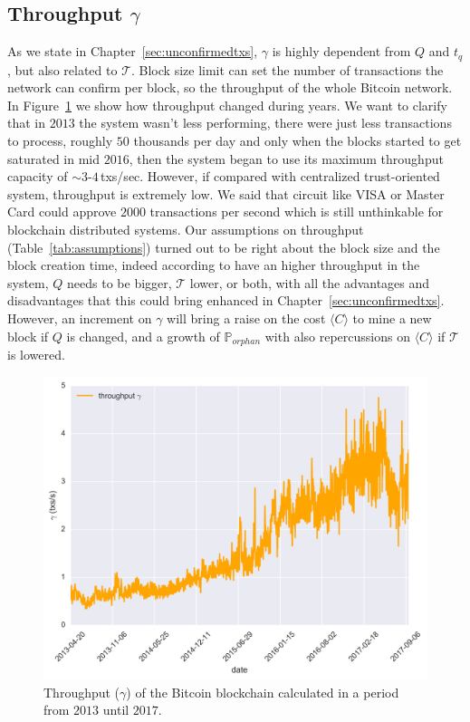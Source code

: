 \documentclass[USenglish]{uit-thesis}
\begin{document}
\subsection{Throughput $\gamma$}
\label{sec:throughput}
As we state in Chapter~\ref{sec:unconfirmedtxs}, $\gamma$
is highly dependent from $Q$ and $t_q$, but also related
to $\mathcal{T}$. Block size limit can set the
number of transactions the network can confirm
per block, so the throughput of the whole Bitcoin
network. In Figure~\ref{fig:throughput} we show how
throughput changed during years. We want to clarify that
in $2013$ the system wasn't less performing, there were just less
transactions to process, roughly $50$ thousands per day and
only when the blocks started to get saturated in mid $2016$, then
the system began to use its maximum throughput capacity of
$\sim$$3$-$4$\,txs/sec. However, if compared with centralized trust-oriented
system, throughput is extremely low. We said that circuit like
VISA or Master Card could approve $2000$ transactions per
second which is still unthinkable for blockchain distributed
systems. Our assumptions on throughput (Table~\ref{tab:assumptions})
turned out to be right about the block size and the block
creation time, indeed according to have an higher throughput
in the system, $Q$ needs to be bigger,
$\mathcal{T}$ lower, or both, with
all the advantages and disadvantages that this could bring
enhanced in Chapter~\ref{sec:unconfirmedtxs}.
However, an increment on $\gamma$ will bring
a raise on the cost $\langle C\rangle$ to
mine a new block if $Q$ is changed, and
a growth of $\mathbb{P}_{orphan}$ with also repercussions
on $\langle C\rangle$ if $\mathcal{T}$ is lowered.
\begin{figure}[h]
	\centering
	\includegraphics[width=1\textwidth]{img/throughput}
	\caption{Throughput ($\gamma$) of the Bitcoin blockchain calculated in a period from $2013$ until $2017$.}
	\label{fig:throughput}
\end{figure}
\end{document}
